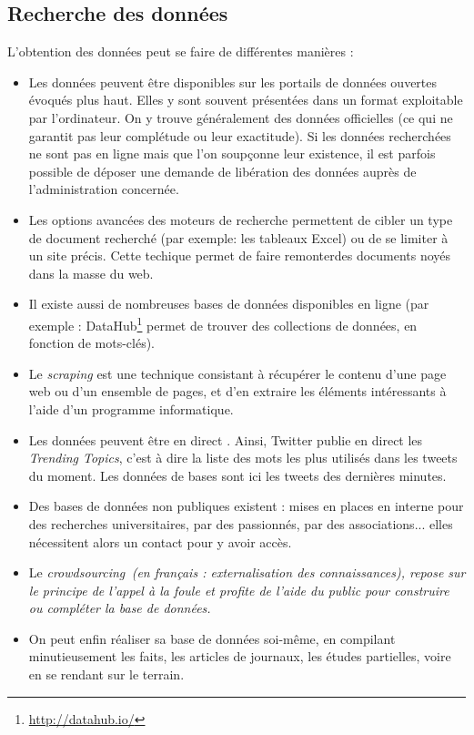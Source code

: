 \subsection{Recherche des données}
L'obtention des données peut se faire de différentes manières :
\begin{itemize}
\item Les données peuvent être disponibles sur les portails de données ouvertes évoqués 
plus haut. Elles y sont souvent présentées dans un format exploitable par l'ordinateur. 
On y trouve généralement des données officielles (ce qui ne garantit pas leur 
complétude ou leur exactitude). Si les données recherchées ne sont pas en ligne mais 
que l'on soupçonne leur existence, il est parfois possible de déposer une demande de \og libération des données \fg auprès de l'administration concernée.
\item Les options avancées des moteurs de recherche permettent de cibler un type de 
document recherché (par exemple: les tableaux Excel) ou de se limiter à un site précis. 
Cette techique permet de faire \og remonter\fg des documents noyés dans la masse du web.
\item Il existe aussi de nombreuses bases de données disponibles en ligne (par exemple : DataHub\footnote{\url{http://datahub.io/}} permet de trouver des collections de données, en fonction de mots-clés).
\item Le \textit{scraping} est une technique consistant à récupérer le contenu d'une page web ou d'un ensemble de pages, et d'en extraire les éléments intéressants à 
l'aide d'un programme informatique.
\item Les données peuvent être en direct \cite{bradshaw}. Ainsi, Twitter publie en direct les \textit{Trending Topics}, c'est à dire la liste des mots les plus utilisés
dans les tweets du moment. Les données de bases sont ici les tweets des dernières minutes.
\item Des bases de données non publiques existent : mises en places en interne pour des recherches universitaires, par des passionnés, par des associations... elles nécessitent alors un contact pour y avoir accès.
\item Le \em crowdsourcing\em\, (en français : externalisation des connaissances), repose sur le principe de \og l'appel à la foule \fg et profite de l'aide du public pour
construire ou compléter la base de données.
\item On peut enfin réaliser sa base de données soi-même, en compilant minutieusement
les faits, les articles de journaux, les études partielles, voire en se rendant sur le terrain.
\end{itemize}

